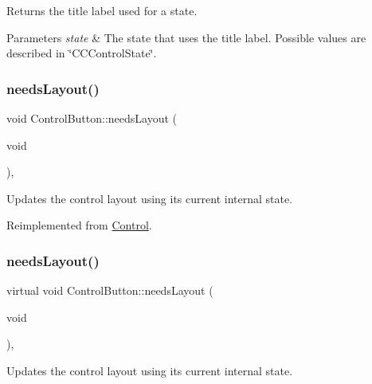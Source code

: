 Returns the title label used for a state.


\begin{DoxyParams}{Parameters}
{\em state} & The state that uses the title label. Possible values are described in \char`\"{}\+C\+C\+Control\+State\char`\"{}. \\
\hline
\end{DoxyParams}
\mbox{\label{classControlButton_acdbe1882298d4920b6ba59e7c72d6aaf}} 
\subsubsection{\texorpdfstring{needs\+Layout()}{needsLayout()}\hspace{0.1cm}{\footnotesize\ttfamily [1/2]}}
{\footnotesize\ttfamily void Control\+Button\+::needs\+Layout (\begin{DoxyParamCaption}\item[{void}]{ }\end{DoxyParamCaption})\hspace{0.3cm}{\ttfamily [override]}, {\ttfamily [virtual]}}

Updates the control layout using its current internal state. 

Reimplemented from \hyperlink{classControl_aa3c7bd1c9d2a072c037c6c9232a336a5}{Control}.

\mbox{\label{classControlButton_af0fc9343439e52c30c72a87183807487}} 
\subsubsection{\texorpdfstring{needs\+Layout()}{needsLayout()}\hspace{0.1cm}{\footnotesize\ttfamily [2/2]}}
{\footnotesize\ttfamily virtual void Control\+Button\+::needs\+Layout (\begin{DoxyParamCaption}\item[{void}]{ }\end{DoxyParamCaption})\hspace{0.3cm}{\ttfamily [override]}, {\ttfamily [virtual]}}

Updates the control layout using its current internal state. 

